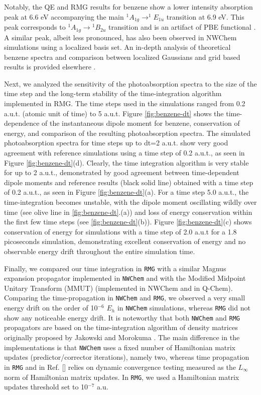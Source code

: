 \documentclass[journal=jctcce,manuscript=article,etalmode=truncate,maxauthors=10,layout=twocolumn,9pt]{achemso}   %
\begin{document}
Notably, the QE and RMG results for benzene show a  lower intensity   absorption peak  at  6.6 eV  accompanying  the  main   $^1A_{1g}\to ^1E_{1u}$ transition at 6.9 eV.  This peak corresponds to  $^1A_{1g}\to {}^1B_{2u}$  transition  and  is an artifact of  PBE functional \cite{Rocha-benzene:2024}. A similar peak, albeit less pronounced, has also been observed in NWChem simulations  using a localized basis set. An in-depth analysis of theoretical benzene spectra and comparison between  localized Gaussians and grid based results is provided  elsewhere \cite{Rocha-benzene:2024}. 


Next, we analyzed the sensitivity of the photoabsorption spectra to the size of the time step  and the long-term stability of the time-integration algorithm implemented  in RMG.
The time steps used in the simulations ranged from 0.2 a.u.t. (atomic unit of time)  to  5 a.u.t.  
Figure  \ref{fig:benzene-dt} shows the time-dependence of the instantaneous dipole moment for benzene,  conservation of energy, and  comparison  of the resulting  photoabsorption spectra.  The simulated  photoabsorption spectra for  time steps up to dt=2 a.u.t. show very good agreement with reference simulations using a time step of 0.2 a.u.t., as seen  in  Figure \ref{fig:benzene-dt}(d).
Clearly, the time integration algorithm is very stable for up to 2 a.u.t., demonstrated by  good agreement between time-dependent dipole moments and reference results (black solid line) obtained with a time step of 0.2 a.u.t., as seen in Figure \ref{fig:benzene-dt}(a).   
 For  a time step 5.0 a.u.t.,  the time-integration  becomes unstable, with the dipole moment oscillating wildly over time (see olive line in \ref{fig:benzene-dt}.(a)) and loss of energy conservation  within the first few  time steps (see \ref{fig:benzene-dt}(b)). 
Figure \ref{fig:benzene-dt}(c) shows conservation of energy for simulations with a time step  of 2.0 a.u.t for  a 1.8 picoseconds simulation, demonstrating excellent conservation of energy and no observable energy drift throughout the  entire simulation  time.  



Finally, we compared our time integration in \texttt{RMG} with a similar Magnus expansion propagator implemented in \texttt{NWChem} and with the Modified Midpoint Unitary Transform (MMUT) (implemented in NWChem and in Q-Chem)\cite{lopata-2011,rt-tddft-qchem}.
Comparing the time-propagation in \texttt{NWChem} and \texttt{RMG}, we observed a very small energy drift on the order of 10$^{-6}$ $E_h$ in \texttt{NWChem} simulations, whereas \texttt{RMG} did not show any noticeable energy drift. It is noteworthy that both \texttt{NWChem} and \texttt{RMG} propagators are based on the time-integration algorithm of density matrices originally proposed by Jakowski and Morokuma \cite{lvnmd}. The main difference in the implementations is that \texttt{NWChem} uses a fixed number of Hamiltonian matrix updates (predictor/corrector iterations), namely two, whereas time propagation in \texttt{RMG} and in Ref. [] relies on dynamic convergence testing measured as the $L_\infty$ norm of Hamiltonian matrix updates. In \texttt{RMG}, we used a Hamiltonian matrix updates threshold set to 10$^{-7}$ a.u.
\end{document}
